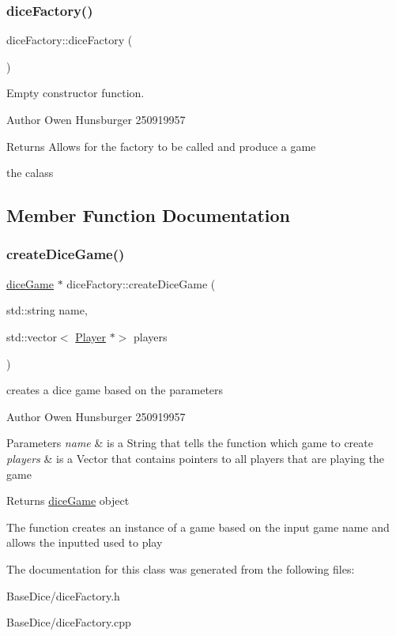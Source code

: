 \subsubsection{\texorpdfstring{dice\+Factory()}{diceFactory()}}
{\footnotesize\ttfamily dice\+Factory\+::dice\+Factory (\begin{DoxyParamCaption}{ }\end{DoxyParamCaption})}



Empty constructor function. 

\begin{DoxyAuthor}{Author}
Owen Hunsburger 250919957 
\end{DoxyAuthor}
\begin{DoxyReturn}{Returns}
Allows for the factory to be called and produce a game
\end{DoxyReturn}
the calass 

\subsection{Member Function Documentation}
\mbox{\label{classdiceFactory_a591c320ac45d0919c9368ea867c856b9}} 
\subsubsection{\texorpdfstring{create\+Dice\+Game()}{createDiceGame()}}
{\footnotesize\ttfamily \hyperlink{classdiceGame}{dice\+Game} $\ast$ dice\+Factory\+::create\+Dice\+Game (\begin{DoxyParamCaption}\item[{std\+::string}]{name,  }\item[{std\+::vector$<$ \hyperlink{classPlayer}{Player} $\ast$$>$}]{players }\end{DoxyParamCaption})}



creates a dice game based on the parameters 

\begin{DoxyAuthor}{Author}
Owen Hunsburger 250919957 
\end{DoxyAuthor}

\begin{DoxyParams}{Parameters}
{\em name} & is a String that tells the function which game to create \\
\hline
{\em players} & is a Vector that contains pointers to all players that are playing the game \\
\hline
\end{DoxyParams}
\begin{DoxyReturn}{Returns}
\hyperlink{classdiceGame}{dice\+Game} object
\end{DoxyReturn}
The function creates an instance of a game based on the input game name and allows the inputted used to play 

The documentation for this class was generated from the following files\+:\begin{DoxyCompactItemize}
\item 
Base\+Dice/dice\+Factory.\+h\item 
Base\+Dice/dice\+Factory.\+cpp\end{DoxyCompactItemize}
